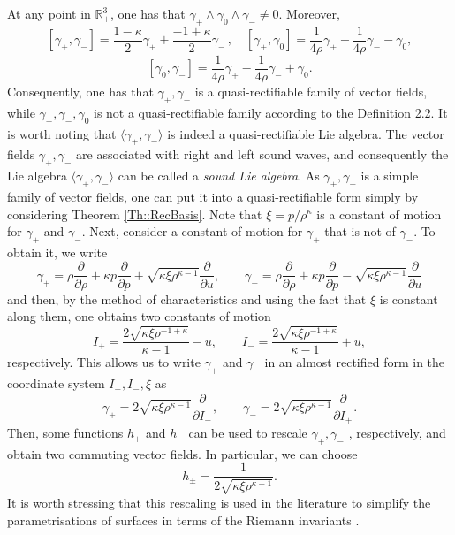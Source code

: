 \documentclass[12pt]{article}
\theoremstyle{plain}
\theoremstyle{definition}
\numberwithin{equation}{section}
\begin{document}
At any point in $\mathbb{R}_+^3$, one has that $\gamma_+\wedge\gamma_0\wedge\gamma_-\neq 0$. Moreover,
$$
[\gamma_+,\gamma_-]=\frac{1-\kappa}{2}\gamma_++\frac{-1+\kappa}{2}\gamma_-\,,\quad [\gamma_+,\gamma_0]=\frac{1}{4\rho}\gamma_+-\frac{1}{4\rho}\gamma_--\gamma_0,$$$$
[\gamma_0,\gamma_-]=\frac{1}{4\rho}\gamma_+-\frac{1}{4\rho}\gamma_-+\gamma_0.
$$
Consequently, one has that  $\gamma_+,\gamma_-$ is a quasi-rectifiable family of vector fields, while $\gamma_+,\gamma_-,\gamma_0$ is not a quasi-rectifiable family according to the Definition 2.2.  It is worth noting that $\langle\gamma_+,\gamma_-\rangle$ is indeed a quasi-rectifiable Lie algebra.  The vector fields $\gamma_+,\gamma_-$ are associated with  right and left sound waves, and consequently the Lie algebra $\langle \gamma_+,\gamma_-\rangle$ can be called a {\it sound Lie algebra}. As $\gamma_+,\gamma_-$ is a simple family of vector fields, one can put it into a quasi-rectifiable form simply by considering Theorem \ref{Th::RecBasis}. Note that  $\xi=p/\rho^\kappa$ is a constant of motion for $\gamma_+$ and $\gamma_-$. Next, consider a constant of motion for $\gamma_+$ that is not of $\gamma_-$. To obtain it, we write 
$$
\gamma_+=\rho\frac{\partial}{\partial \rho}+\kappa p\frac{\partial}{\partial p}+\sqrt{\kappa 
\xi\rho^{\kappa-1} }\frac{\partial}{\partial u},\qquad
\gamma_-=\rho\frac{\partial}{\partial \rho}+\kappa p\frac{\partial}{\partial p}-\sqrt{\kappa 
\xi\rho^{\kappa-1} }\frac{\partial}{\partial u}
$$
and then, by the method of characteristics and using the fact that $\xi$ is constant along them, one obtains two constants of motion
$$
I_+=\frac{2\sqrt{\kappa\xi \rho^{-1+\kappa}}}{\kappa-1}-u,\qquad I_-=\frac{2\sqrt{\kappa\xi \rho^{-1+\kappa}}}{\kappa-1}+u,
$$
respectively. This allows us to write $\gamma_+$ and $\gamma_-$ in an almost rectified form in the coordinate system $I_+,I_-,\xi$ as 
$$
\gamma_+=2\sqrt{\kappa \xi\rho^{\kappa-1}}\frac{\partial}{\partial I_-},\qquad \gamma_-=2\sqrt{\kappa \xi\rho^{\kappa-1}}\frac{\partial}{\partial I_+}.
$$Then, some functions $h_+$ and $h_-$ can be used to rescale $\gamma_+,\gamma_-$ , respectively, and obtain two commuting vector fields. In particular, we can choose
$$
h_\pm=\frac{1}{2\sqrt{\kappa \xi\rho^{\kappa-1}}}.
$$
It is worth stressing that this rescaling is used in the literature to simplify the parametrisations of surfaces in terms of the Riemann invariants \cite{Gr23}.
\end{document}
